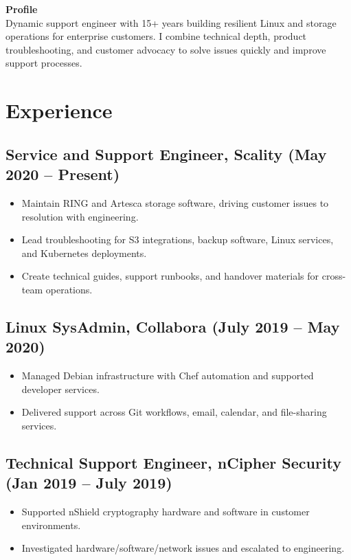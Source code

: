 \documentclass[9pt,a4paper]{article}
\begin{document}
\begin{minipage}[t]{0.65\textwidth}
  \textbf{Profile}\\
  Dynamic support engineer with 15+ years building resilient Linux and storage operations for enterprise customers. I combine technical depth, product troubleshooting, and customer advocacy to solve issues quickly and improve support processes.\\[0.75em]
  \section*{Experience}
  \subsection*{Service and Support Engineer, Scality \textnormal{(May 2020 -- Present)}}
  \begin{itemize}
    \item Maintain RING and Artesca storage software, driving customer issues to resolution with engineering.
    \item Lead troubleshooting for S3 integrations, backup software, Linux services, and Kubernetes deployments.
    \item Create technical guides, support runbooks, and handover materials for cross-team operations.
  \end{itemize}
  \subsection*{Linux SysAdmin, Collabora \textnormal{(July 2019 -- May 2020)}}
  \begin{itemize}
    \item Managed Debian infrastructure with Chef automation and supported developer services.
    \item Delivered support across Git workflows, email, calendar, and file-sharing services.
  \end{itemize}
  \subsection*{Technical Support Engineer, nCipher Security \textnormal{(Jan 2019 -- July 2019)}}
  \begin{itemize}
    \item Supported nShield cryptography hardware and software in customer environments.
    \item Investigated hardware/software/network issues and escalated to engineering.
  \end{itemize}

\end{minipage}
\end{document}
